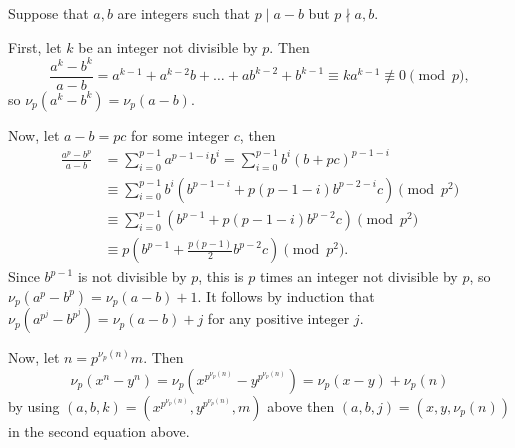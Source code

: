 Suppose that $a,b$ are integers such that $p\mid a-b$ but $p\nmid a,b$.

First, let $k$ be an integer not divisible by $p$. Then \[\frac{a^k-b^k}{a-b}=a^{k-1}+a^{k-2}b+\ldots+ab^{k-2}+b^{k-1}\equiv ka^{k-1}\not\equiv0\pmod p,\] so $\nu_p\left(a^k-b^k\right)=\nu_p\left(a-b\right)$.

Now, let $a-b=pc$ for some integer $c$, then
\begin{align*}
	\frac{a^p-b^p}{a-b}&=\displaystyle\sum_{i=0}^{p-1}a^{p-1-i}b^i=\displaystyle\sum_{i=0}^{p-1}b^i\left(b+pc\right)^{p-1-i}\\
	&\equiv\displaystyle\sum_{i=0}^{p-1}b^i\left(b^{p-1-i}+p\left(p-1-i\right)b^{p-2-i}c\right)\pmod{p^2}\\
	&\equiv\displaystyle\sum_{i=0}^{p-1}\left(b^{p-1}+p\left(p-1-i\right)b^{p-2}c\right)\pmod{p^2}\\
	&\equiv p\left(b^{p-1}+\frac{p\left(p-1\right)}{2}b^{p-2}c\right)\pmod{p^2}.
\end{align*}
Since $b^{p-1}$ is not divisible by $p$, this is $p$ times an integer not divisible by $p$, so $\nu_p\left(a^p-b^p\right)=\nu_p\left(a-b\right)+1$. It follows by induction that $\nu_p\left(a^{p^j}-b^{p^j}\right)=\nu_p\left(a-b\right)+j$ for any positive integer $j$.

Now, let $n=p^{\nu_p\left(n\right)}m$. Then \[\nu_p\left(x^n-y^n\right)=\nu_p\left(x^{p^{\nu_p\left(n\right)}}-y^{p^{\nu_p\left(n\right)}}\right)=\nu_p\left(x-y\right)+\nu_p\left(n\right)\] by using $\left(a,b,k\right)=\left(x^{p^{\nu_p\left(n\right)}},y^{p^{\nu_p\left(n\right)}},m\right)$ above then $\left(a,b,j\right)=\left(x,y,\nu_p\left(n\right)\right)$ in the second equation above.